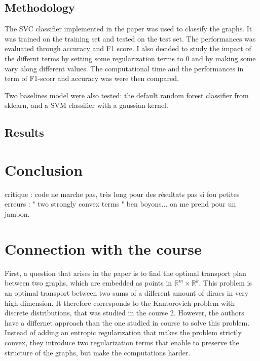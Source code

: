 \documentclass[a4paper,11pt]{article}
\begin{document}
\subsection{Methodology}

The SVC classifier implemented in the paper was used to classify the graphs. 
It was trained on the training set and tested on the test set.
The performances was evaluated through accuracy and F1 score.
I also decided to study the impact of the differnt terms by setting some regularization terms to 0 and by making some vary along different values. 
The computational time and the performances in term of F1-scorr and accuracy was were then compared. 

Two baselines model were also tested: the default random forest classifier from sklearn, and a SVM classifier with a gaussian kernel.





\subsection{Results}

\section{Conclusion}

critique : code ne marche pas, très long pour des résultats pas si fou 
petites erreurs : " two strongly convex terms " ben boyons... on me prend pour un jambon.

\section{Connection with the course}

First, a question that arises in the paper is to find the optimal transport plan between two graphs, which are embedded as points in $\mathbb{R}^m \times \mathbb{R}^k$.
This problem is an optimal transport between two sums of a different amount of diracs in very high dimension. 
It therefore corresponds to the Kantorovich problem with discrete distributions, that was studied in the course 2. 
However, the authors have a differnet approach than the one studied in course to solve this problem. 
Instead of adding an entropic regularization that makes the problem strictly convex, they introduce two regularization terms that enable to preserve the structure of the graphs, but make the computations harder. 
\end{document}
